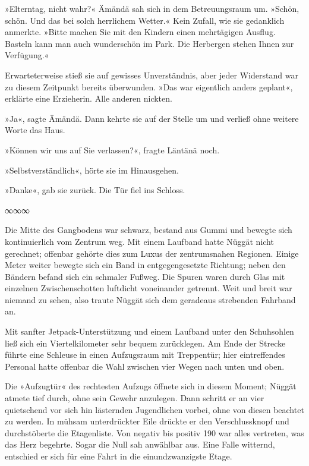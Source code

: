 »Elterntag, nicht wahr?« Ämändä sah sich in dem Betreuungsraum um. »Schön, schön. Und das bei solch herrlichem Wetter.« Kein Zufall, wie sie gedanklich anmerkte. »Bitte machen Sie mit den Kindern einen mehrtägigen Ausflug. Basteln kann man auch wunderschön im Park. Die Herbergen stehen Ihnen zur Verfügung.«

Erwarteterweise stieß sie auf gewisses Unverständnis, aber jeder Widerstand war zu diesem Zeitpunkt bereits überwunden. »Das war eigentlich anders geplant«, erklärte eine Erzieherin. Alle anderen nickten.

»Ja«, sagte Ämändä. Dann kehrte sie auf der Stelle um und verließ ohne weitere Worte das Haus.

»Können wir uns auf Sie verlassen?«, fragte Läntänä noch.

»Selbstverständlich«, hörte sie im Hinausgehen.

»Danke«, gab sie zurück. Die Tür fiel ins Schloss.

\begin{center}
	∞∞∞
\end{center}

Die Mitte des Gangbodens war schwarz, bestand aus Gummi und bewegte sich kontinuierlich vom Zentrum weg. Mit einem Laufband hatte Nüggät nicht gerechnet; offenbar gehörte dies zum Luxus der zentrumsnahen Regionen. Einige Meter weiter bewegte sich ein Band in entgegengesetzte Richtung; neben den Bändern befand sich ein schmaler Fußweg. Die Spuren waren durch Glas mit einzelnen Zwischenschotten luftdicht voneinander getrennt. Weit und breit war niemand zu sehen, also traute Nüggät sich dem geradeaus strebenden Fahrband an.

Mit sanfter Jetpack-Unterstützung und einem Laufband unter den Schuhsohlen ließ sich ein Viertelkilometer sehr bequem zurücklegen. Am Ende der Strecke führte eine Schleuse in einen Aufzugsraum mit Treppentür; hier eintreffendes Personal hatte offenbar die Wahl zwischen vier Wegen nach unten und oben.

Die »Aufzugtür« des rechtesten Aufzugs öffnete sich in diesem Moment; Nüggät atmete tief durch, ohne sein Gewehr anzulegen. Dann schritt er an vier quietschend vor sich hin lästernden Jugendlichen vorbei, ohne von diesen beachtet zu werden. In mühsam unterdrückter Eile drückte er den Verschlussknopf und durchstöberte die Etagenliste. Von negativ bis positiv 190 war alles vertreten, was das Herz begehrte. Sogar die Null sah anwählbar aus. Eine Falle witternd, entschied er sich für eine Fahrt in die einundzwanzigste Etage.

